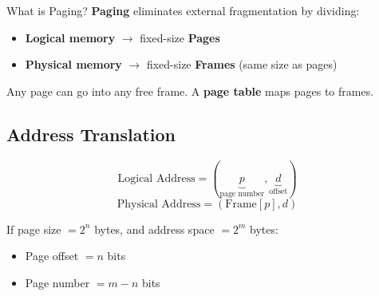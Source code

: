 \documentclass[12pt,a4paper]{article}
\begin{document}
\begin{conceptbox}{What is Paging?}
\textbf{Paging} eliminates external fragmentation by dividing:
\begin{itemize}
    \item \textbf{Logical memory} $\rightarrow$ fixed-size \textbf{Pages}
    \item \textbf{Physical memory} $\rightarrow$ fixed-size \textbf{Frames} (same size as pages)
\end{itemize}
Any page can go into any free frame. A \textbf{page table} maps pages to frames.
\end{conceptbox}

\subsection{Address Translation}
\[
\text{Logical Address} = (\underbrace{p}_{\text{page number}}, \underbrace{d}_{\text{offset}})
\]
\[
\text{Physical Address} = (\text{Frame}[p], d)
\]

If page size $= 2^n$ bytes, and address space $= 2^m$ bytes:
\begin{itemize}
    \item Page offset $= n$ bits
    \item Page number $= m - n$ bits
\end{itemize}
\end{document}
